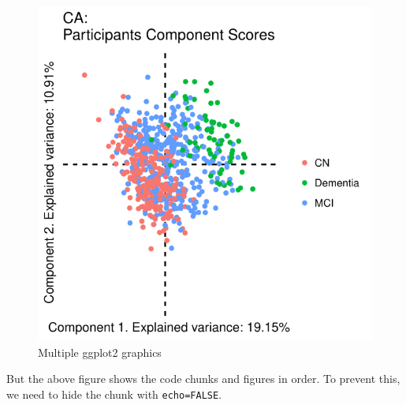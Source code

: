 \documentclass[]{article}
\begin{document}
\begin{figure}[H]

{\centering \includegraphics{1_a_Simple_RMarkdown_PDF_files/figure-latex/unnamed-chunk-1-2} 

}

\caption{Multiple ggplot2 graphics}\label{fig:unnamed-chunk-12}
\end{figure}

But the above figure shows the code chunks and figures in order. To
prevent this, we need to hide the chunk with \texttt{echo=FALSE}.
\end{document}
